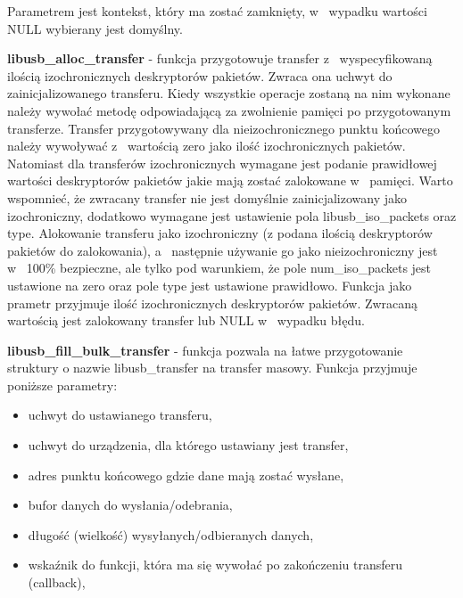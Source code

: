 \documentclass{BscUS}
\begin{document}
\begin{itemize}
{%
Parametrem jest kontekst, który ma zostać zamknięty, w~ wypadku wartości NULL wybierany jest domyślny.
\item \textbf{libusb\_alloc\_transfer} - funkcja przygotowuje transfer z~ wyspecyfikowaną ilością 	izochronicznych deskryptorów pakietów.
Zwraca ona uchwyt do zainicjalizowanego transferu. Kiedy wszystkie operacje zostaną na nim wykonane należy wywołać metodę odpowiadającą za zwolnienie pamięci po przygotowanym transferze.
Transfer przygotowywany dla nieizochronicznego punktu końcowego należy wywoływać z~ wartością zero jako ilość izochronicznych pakietów.
Natomiast dla transferów izochronicznych wymagane jest podanie prawidłowej wartości deskryptorów pakietów jakie mają zostać zalokowane w~ pamięci. Warto wspomnieć, że zwracany transfer nie jest domyślnie zainicjalizowany jako izochroniczny, dodatkowo wymagane jest ustawienie pola libusb\_iso\_packets oraz type.
Alokowanie transferu jako izochroniczny (z podana ilością deskryptorów pakietów do zalokowania), a~ następnie używanie go jako nieizochroniczny jest w~ 100\% bezpieczne, ale tylko pod warunkiem, że pole num\_iso\_packets jest ustawione na zero oraz pole type jest ustawione prawidłowo.
Funkcja jako prametr przyjmuje ilość izochronicznych deskryptorów pakietów.
Zwracaną wartością jest zalokowany transfer lub NULL w~ wypadku błędu.
\newpage %
\item \textbf{libusb\_fill\_bulk\_transfer} - funkcja pozwala na łatwe przygotowanie struktury o nazwie libusb\_transfer na transfer masowy.
Funkcja przyjmuje poniższe parametry:
\begin{itemize}
\item uchwyt do ustawianego transferu,
\item uchwyt do urządzenia, dla którego ustawiany jest transfer,
\item adres punktu końcowego gdzie dane mają zostać wysłane,
\item bufor danych do wysłania/odebrania,
\item długość (wielkość) wysyłanych/odbieranych danych,
\item wskaźnik do funkcji, która ma się wywołać po zakończeniu transferu (callback),

\end{itemize}}
\end{itemize}
\end{document}
